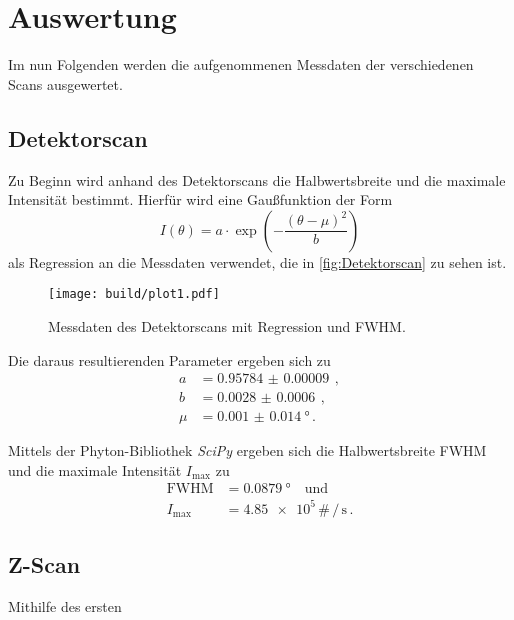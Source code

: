 \section{Auswertung}
\label{sec:Auswertung}

Im nun Folgenden werden die aufgenommenen Messdaten der verschiedenen Scans ausgewertet. 


\subsection{Detektorscan}
\label{sec:Detektorscan}

Zu Beginn wird anhand des Detektorscans die Halbwertsbreite und die maximale Intensität bestimmt.
Hierfür wird eine Gaußfunktion der Form
\begin{equation}
    I(\theta)= a \cdot \exp \left(-\frac{(\theta-\mu)^2}{b}\right)
\end{equation}
als Regression an die Messdaten verwendet,
die in \autoref{fig:Detektorscan} zu sehen ist.
\begin{figure}
    \centering
    \texttt{[image: build/plot1.pdf]}
    \caption{Messdaten des Detektorscans mit Regression und FWHM.}
    \label{fig:plot1}
\end{figure}

Die daraus resultierenden Parameter ergeben sich zu 
\begin{align*}
    a & = \qty{0.95784(9)}{} \, , \\
    b & = \qty{0.0028(6)}{} \, , \\
    \mu & = \qty{0.001(14)}{\degree} \, .
\end{align*}

Mittels der Phyton-Bibliothek \textit{SciPy} \cite{scipy} ergeben sich die Halbwertsbreite FWHM
und die maximale Intensität $I_\text{max}$ zu
\begin{align*}
    \text{FWHM} & = \qty{0.0879}{\degree} \quad \text{und} \\
    I_\text{max} & = \num{4.85e5} \, \# \, / \, \unit{\second} \, .
\end{align*}


\subsection{Z-Scan}

Mithilfe des ersten 